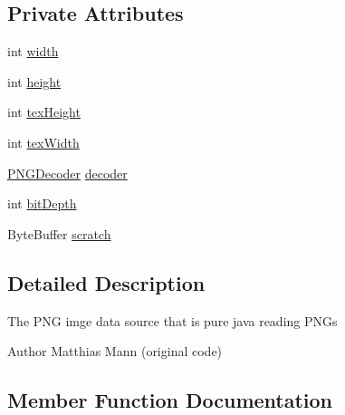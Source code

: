 \subsection*{Private Attributes}
\begin{DoxyCompactItemize}
\item 
int \mbox{\hyperlink{classorg_1_1newdawn_1_1slick_1_1opengl_1_1_p_n_g_image_data_a2f5956db335a1e779f14e4b06468ec5b}{width}}
\item 
int \mbox{\hyperlink{classorg_1_1newdawn_1_1slick_1_1opengl_1_1_p_n_g_image_data_a710f967c33c6af6902136406cffc1290}{height}}
\item 
int \mbox{\hyperlink{classorg_1_1newdawn_1_1slick_1_1opengl_1_1_p_n_g_image_data_a211e8cf4c57b3ed4bf7f1811bd3ebe11}{tex\+Height}}
\item 
int \mbox{\hyperlink{classorg_1_1newdawn_1_1slick_1_1opengl_1_1_p_n_g_image_data_a2175af9c4d26dbfce0d4fe0546cb92df}{tex\+Width}}
\item 
\mbox{\hyperlink{classorg_1_1newdawn_1_1slick_1_1opengl_1_1_p_n_g_decoder}{P\+N\+G\+Decoder}} \mbox{\hyperlink{classorg_1_1newdawn_1_1slick_1_1opengl_1_1_p_n_g_image_data_a138d039c00978af25b84d897d0623be2}{decoder}}
\item 
int \mbox{\hyperlink{classorg_1_1newdawn_1_1slick_1_1opengl_1_1_p_n_g_image_data_adcf8b9e32837d9853842349385a37c22}{bit\+Depth}}
\item 
Byte\+Buffer \mbox{\hyperlink{classorg_1_1newdawn_1_1slick_1_1opengl_1_1_p_n_g_image_data_a5b415adc969b5a83d7ecf1556a085bbf}{scratch}}
\end{DoxyCompactItemize}


\subsection{Detailed Description}
The P\+NG imge data source that is pure java reading P\+N\+Gs

\begin{DoxyAuthor}{Author}
Matthias Mann (original code) 
\end{DoxyAuthor}


\subsection{Member Function Documentation}
\mbox{\label{classorg_1_1newdawn_1_1slick_1_1opengl_1_1_p_n_g_image_data_a9083d1ca4c73f7d648eaa73d477d4d63}} 
